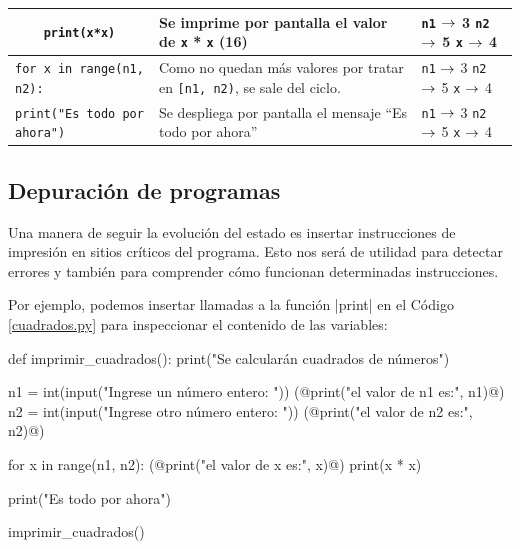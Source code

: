 \begin{longtable}[c]{|p{5.5cm}|p{5.5cm}|p{1.5cm}|}
\hline
\lstinline+    print(x*x)+
&
Se imprime por pantalla el valor de \lstinline!x! * \lstinline!x! (16)
&
\lstinline!n1! $\rightarrow$ 3 \newline
\lstinline!n2! $\rightarrow$ 5 \newline
\lstinline!x! $\rightarrow$ 4 \\

\hline
\lstinline+for x in range(n1, n2):+
&
Como no quedan más valores por tratar en \lstinline![n1, n2)!,
se sale del ciclo.
&
\lstinline!n1! $\rightarrow$ 3 \newline
\lstinline!n2! $\rightarrow$ 5 \newline
\lstinline!x! $\rightarrow$ 4 \\

\hline
\lstinline+print("Es todo por ahora")+
&
Se despliega por pantalla el mensaje ``Es todo por ahora''
&
\lstinline!n1! $\rightarrow$ 3 \newline
\lstinline!n2! $\rightarrow$ 5 \newline
\lstinline!x! $\rightarrow$ 4 \\

\hline
\end{longtable}

\subsection{Depuración de programas}

Una manera de seguir la evolución del estado es insertar instrucciones de impresión
en sitios críticos del programa. Esto nos será de utilidad para detectar errores
y también para comprender cómo funcionan determinadas instrucciones.

Por ejemplo, podemos insertar llamadas a la función |print| en el Código
\ref{cuadrados.py} para inspeccionar el contenido de las variables:

\begin{codigo-python-sn}
def imprimir_cuadrados():
    print("Se calcularán cuadrados de números")

    n1 = int(input("Ingrese un número entero: "))
    (@print("el valor de n1 es:", n1)@)
    n2 = int(input("Ingrese otro número entero: "))
    (@print("el valor de n2 es:", n2)@)

    for x in range(n1, n2):
        (@print("el valor de x es:", x)@)
        print(x * x)

    print("Es todo por ahora")

imprimir_cuadrados()
\end{codigo-python-sn}


